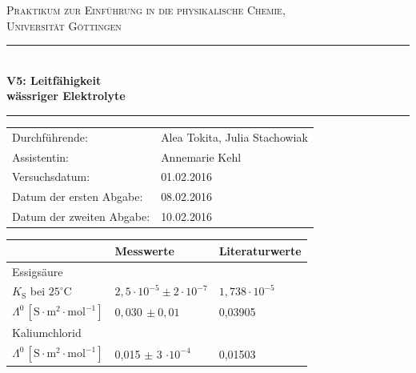\documentclass[12pt,a4paper,titlepage,headinclude,bibtotoc]{scrartcl}
\begin{document}
\begin{titlepage}
\centering
\textsc{\Large Praktikum zur Einführung in die physikalische Chemie,\\[1.5ex] Universität Göttingen}

\vspace*{0.5cm}

\rule{\textwidth}{1pt}\\[0.5cm]
{\huge \bfseries
  V5: Leitfähigkeit\\[1.5ex]
  wässriger Elektrolyte}\\[0.5cm]
\rule{\textwidth}{1pt}

\vspace*{0.5cm}


\begin{Large}
\begin{tabular}{ll}
Durchführende: &  Alea Tokita, Julia Stachowiak\\
Assistentin: & Annemarie Kehl\\
 Versuchsdatum: & 01.02.2016\\
 Datum der ersten Abgabe: & 08.02.2016\\
 Datum der zweiten Abgabe: & 10.02.2016\\

\end{tabular}
\end{Large}

\vspace*{1cm}
\begin{large}
\begin{table} [h]
\centering 
\begin{tabular}{p{3cm}|p{5cm}p{5cm}}
& Messwerte & Literaturwerte\\
\hline
Essigsäure & &\\
 $K_{\mathrm{S}}$  bei $25^\circ\text{C}$ & $2,5 \cdot 10^{-5} \pm 2 \cdot 10^{-7}$& $1,738 \cdot 10^{-5}$\\
$\mathit{\Lambda^0}\, [\mathrm{S} \cdot \mathrm{m^2} \cdot \mathrm{mol^{-1}}]$ & $ 0,030\, \pm 0,01 $& 0,03905\\
\hline
Kaliumchlorid & &\\
$\mathit{\Lambda^0}\, [\mathrm{S} \cdot \mathrm{m^2} \cdot \mathrm{mol^{-1}}]$ & 0,015 $\pm$ 3 $\cdot 10^{-4}$ & 0,01503\\
\end{tabular}
\end{table}
\end{large}


\end{titlepage}
\end{document}
